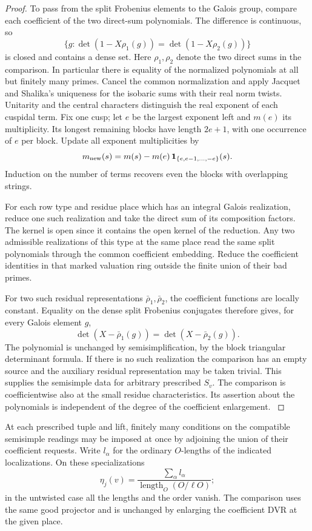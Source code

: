 \begin{proof}
To pass from the split Frobenius elements to the Galois group, compare each coefficient of the two direct-sum polynomials. The difference is continuous, so
\[
 \{g:\det(1-X\rho_1(g))=\det(1-X\rho_2(g))\}
\]
is closed and contains a dense set. Here \(\rho_1,\rho_2\) denote the two direct sums in the comparison. In particular there is equality of the normalized
polynomials at all but finitely many primes. Cancel the common
normalization and apply Jacquet and Shalika's uniqueness for the
isobaric sums with their real norm twists. Unitarity and the
central characters distinguish the real exponent of each
cuspidal term. Fix one cusp; let \(e\) be the largest exponent
left and \(m(e)\) its multiplicity. Its longest remaining blocks
have length \(2e+1\), with one occurrence of \(e\) per block.
Update all exponent multiplicities by
\[
 m_{\rm new}(s)=m(s)-m(e)\,\mathbf 1_{\{e,e-1,\ldots,-e\}}(s).
\]
Induction on the number of terms recovers even the blocks with
overlapping strings. \cite{blggt-attachment,jacquet-shalika-ii}\label{cor:automorphic-realization-36}

For each row type and residue place which has an integral Galois
realization, reduce one such realization and take the direct sum of
its composition factors. The kernel is open since it contains
the open kernel of the reduction. Any two admissible realizations
of this type at the same place read the same split polynomials
through the common coefficient embedding. Reduce the coefficient
identities in that marked valuation ring outside the finite union
of their bad primes.

For two such residual representations \(\bar\rho_1,\bar\rho_2\),
the coefficient functions are locally constant. Equality on the dense
split Frobenius conjugates therefore gives, for every Galois element \(g\),
\[
 \det(X-\bar\rho_1(g))=\det(X-\bar\rho_2(g)).
\] The polynomial is unchanged by
semisimplification, by the block triangular determinant formula.
If there is no such realization the comparison has an empty source
and the auxiliary residual representation may be taken trivial.
This supplies the semisimple data for arbitrary prescribed
\(S_v\). The comparison is coefficientwise also at the small residue
characteristics. Its assertion about the polynomials is independent
of the degree of the coefficient enlargement.
\label{cor:automorphic-realization-37}
\end{proof}

\begin{proposition}\label{prop:joint-row-orders}
At each prescribed tuple and lift, finitely many conditions
on the compatible semisimple readings may be imposed at once
by adjoining the union of their coefficient requests. Write \(l_\alpha\) for the ordinary \(O\)-lengths of the indicated localizations. On these specializations
\[
 \eta_j(v)=\frac{\sum_\alpha l_\alpha}{\operatorname{length}_O(O/\ell O)};
\]
in the untwisted case all the lengths and the order vanish. The comparison uses the same good
projector and is unchanged by enlarging the coefficient DVR
at the given place.
\end{proposition}

